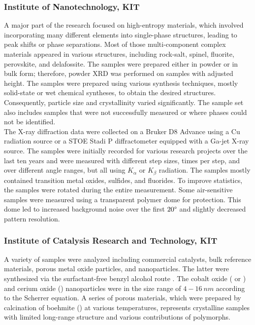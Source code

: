 \subsubsection*{Institute of Nanotechnology, KIT}

A major part of the research focused on high-entropy materials, which involved incorporating many different elements into single-phase structures, leading to peak shifts or phase separations. Most of those multi-component complex materials appeared in various structures, including rock-salt, spinel, fluorite, perovskite, and delafossite. The samples were prepared either in powder or in bulk form; therefore, powder XRD was performed on samples with adjusted height. The samples were prepared using various synthesis techniques, mostly solid-state or wet chemical syntheses, to obtain the desired structures. Consequently, particle size and crystallinity varied significantly. The sample set also includes samples that were not successfully measured or where phases could not be identified. \\

The X-ray diffraction data were collected on a Bruker D8 Advance using a Cu radiation source or a STOE Stadi P diffractometer equipped with a Ga-jet X-ray source. The samples were initially recorded for various research projects over the last ten years and were measured with different step sizes, times per step, and over different angle ranges, but all using  $K_\alpha$ or  $K_\beta$ radiation. The samples mostly contained transition metal oxides, sulfides, and fluorides. To improve statistics, the samples were rotated during the entire measurement. Some air-sensitive samples were measured using a transparent polymer dome for protection. This dome led to increased background noise over the first $20\degree$ and slightly decreased pattern resolution. \\ 

\subsubsection*{Institute of Catalysis Research and Technology, KIT}

A variety of samples were analyzed including commercial catalysts, bulk reference materials, porous metal oxide particles, and nanoparticles. The latter were synthesized via the surfactant-free benzyl alcohol route \cite{Wolf2019, Wolf2018}. The cobalt oxide ( or ) and cerium oxide () nanoparticles were in the size range of $4-16 \ \si{nm}$ according to the Scherrer equation. A series of porous  materials, which were prepared by calcination of boehmite () at various temperatures, represents crystalline samples with limited long-range structure and various contributions of  polymorphs.\\

